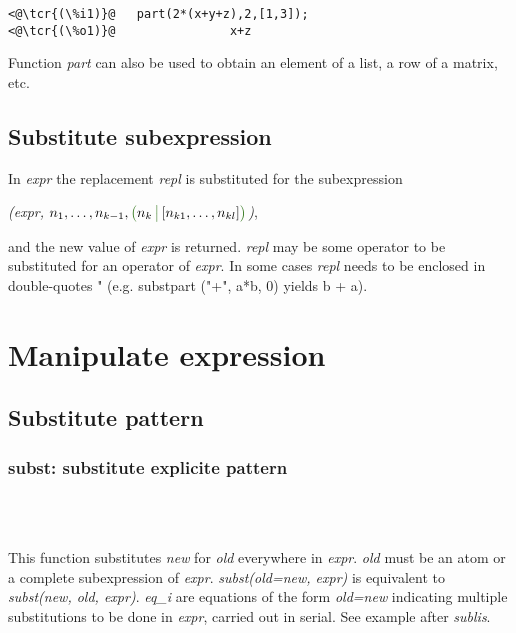 \documentclass[../Maxima_Workbook.tex]{subfiles}
\begin{document}
\lz \begin{small}
\color{blue}
\begin{lstlisting}
<@\tcr{(\%i1)}@   part(2*(x+y+z),2,[1,3]);
<@\tcr{(\%o1)}@			       x+z
\end{lstlisting}
\color{black}
\end{small}

\lz Function \emph{part} can also be used to obtain an element of a list, a row of a matrix, etc.

\subsection{Substitute subexpression}

\lz {} \hfill \tcr{[function]}

\lz In \emph{expr} the replacement \emph{repl} is substituted for the subexpression 
\begin{center}
	 \emph{(expr, $ n_1,\dots,n_{k-1},\gpal n_k \gbar [n_{k1},\dots,n_{kl}] \gpar $)},
\end{center}
and the new value of \emph{expr} is returned. \emph{repl} may be some operator to be substituted for an operator of \emph{expr}. In some cases \emph{repl} needs to be enclosed in double-quotes " (e.g.
substpart ("+", a*b, 0) yields b + a).

\section{Manipulate expression}

\subsection{Substitute pattern}

\subsubsection{subst: substitute explicite pattern}

\lz{} \hfill \tcr{[function]} \\
\emph{} \\
\emph{}

\lz This function substitutes \emph{new} for \emph{old} everywhere in \emph{expr}. \emph{old} must be an atom or a complete subexpression of \emph{expr}. \emph{subst(old=new, expr)} is equivalent to \emph{subst(new, old, expr)}. \emph{eq\_i} are equations of the form \emph{old=new} indicating multiple substitutions to be done in \emph{expr}, carried out in serial. See example after \emph{sublis}. 
\end{document}
